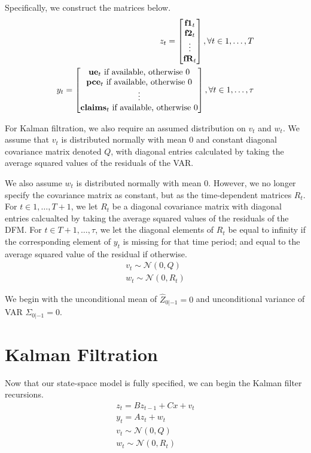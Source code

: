 \documentclass[11pt, letterpaper]{article}\usepackage[]{graphicx}\usepackage[]{color}
\newcommand{\vv}[1]{\textcolor{black}{\mathbf{#1}}}
\begin{document}
Specifically, we construct the matrices below.
\begin{align*}
z_t
=
\begin{bmatrix}
	\vv{f1}_{t}\\
	\vv{f2}_{t}\\
	\vdots \\
	\vv{fR}_{t}
\end{bmatrix}, \forall t \in 1, \dots, T\\
y_t
=
\begin{bmatrix}
	\text{$\vv{ue}_{t}$ if available, otherwise 0}\\
	\text{$\vv{pce}_{t}$ if available, otherwise 0}\\
	\vdots \\
	\text{$\vv{claims}_{t}$ if available, otherwise 0}\\
\end{bmatrix}, \forall t \in 1, \dots, \tau
\end{align*}

For Kalman filtration, we also require an assumed distribution on $v_t$ and $w_t$. We assume that $v_t$ is distributed normally with mean 0 and constant diagonal covariance matrix denoted $Q$, with diagonal entries calculated by taking the average squared values of the residuals of the VAR.

We also assume $w_t$ is distributed normally with mean $0$. However, we no longer specify the covariance matrix as constant, but as the time-dependent matrices $R_t$. For $t \in 1, \dots, T+1$, we let $R_t$ be a diagonal covariance matrix with diagonal entries calcualted by taking the average squared values of the residuals of the DFM. For $t \in T+1, \dots, \tau$, we let the diagonal elements of $R_t$ be equal to infinity if the corresponding element of $y_t$ is missing for that time period; and equal to the average squared value of the residual if otherwise.
\begin{align*}
	v_t \sim \mathcal{N}(0, Q)\\
	w_t \sim \mathcal{N}(0, R_t)
\end{align*}

We begin with the unconditional mean of $\widehat{Z}_{0|-1} = 0$ and unconditional variance of VAR $\Sigma_{0|-1} = 0$.

\section{Kalman Filtration}
Now that our state-space model is fully specified, we can begin the Kalman filter recursions.
\begin{align*}
	z_t = B z_{t-1} + Cx + v_t\\
	y_t = A z_t + w_t\\
	v_t \sim \mathcal{N}(0, Q)\\
	w_t \sim \mathcal{N}(0, R_t)
\end{align*}
\end{document}

